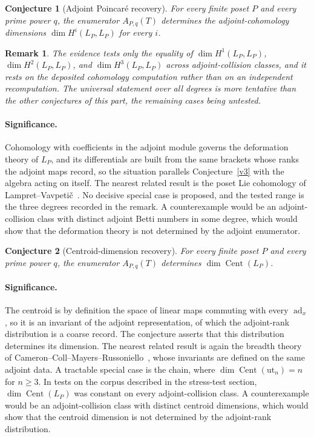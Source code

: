 \documentclass[11pt]{article}
\newtheorem{conjecture}{Conjecture}
\newtheorem{remark}{Remark}
\theoremstyle{definition}
\begin{document}
\begin{conjecture}[Adjoint Poincar\'e recovery]\label{v5}
For every finite poset $P$ and every prime power $q$, the enumerator $A_{P,q}(T)$ determines the adjoint-cohomology dimensions $\dim H^i(L_P,L_P)$ for every $i$.
\end{conjecture}

\begin{remark}
The evidence tests only the equality of $\dim H^1(L_P,L_P)$, $\dim H^2(L_P,L_P)$, and $\dim H^3(L_P,L_P)$ across adjoint-collision classes, and it rests on the deposited cohomology computation rather than on an independent recomputation.  The universal statement over all degrees is more tentative than the other conjectures of this part, the remaining cases being untested.
\end{remark}

\paragraph{Significance.}
Cohomology with coefficients in the adjoint module governs the deformation theory of $L_P$, and its differentials are built from the same brackets whose ranks the adjoint maps record, so the situation parallels Conjecture~\ref{v3} with the algebra acting on itself.  The nearest related result is the poset Lie cohomology of Lampret--Vavpeti\v{c}~\cite{LV}.  No decisive special case is proposed, and the tested range is the three degrees recorded in the remark.  A counterexample would be an adjoint-collision class with distinct adjoint Betti numbers in some degree, which would show that the deformation theory is not determined by the adjoint enumerator.

\begin{conjecture}[Centroid-dimension recovery]\label{v6}
For every finite poset $P$ and every prime power $q$, the enumerator $A_{P,q}(T)$ determines $\dim\operatorname{Cent}(L_P)$.
\end{conjecture}

\paragraph{Significance.}
The centroid is by definition the space of linear maps commuting with every $\operatorname{ad}_x$, so it is an invariant of the adjoint representation, of which the adjoint-rank distribution is a coarse record.  The conjecture asserts that this distribution determines its dimension.  The nearest related result is again the breadth theory of Cameron--Coll--Mayers--Russoniello~\cite{CCMR}, whose invariants are defined on the same adjoint data.  A tractable special case is the chain, where $\dim\operatorname{Cent}(\mathrm{ut}_n)=n$ for $n\ge3$.  In tests on the corpus described in the stress-test section, $\dim\operatorname{Cent}(L_P)$ was constant on every adjoint-collision class.  A counterexample would be an adjoint-collision class with distinct centroid dimensions, which would show that the centroid dimension is not determined by the adjoint-rank distribution.
\end{document}

